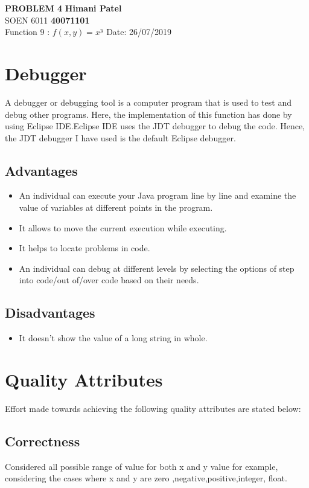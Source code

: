 \documentclass[a4paper, 11pt]{article}
\begin{document}
\noindent
\large\textbf{PROBLEM 4} \hfill \textbf{Himani Patel} \\
\normalsize SOEN 6011 \hfill \textbf{40071101} \\
Function 9 :  $f(x,y)= x^y$  \hfill Date: 26/07/2019 \\

\section{Debugger}

A debugger or debugging tool is a computer program that is used to test and debug other programs.
Here, the implementation of this function has done by using Eclipse IDE.Eclipse IDE uses the JDT debugger to debug the code. Hence, the JDT debugger I have used is the default Eclipse debugger.

\subsection{Advantages}
\begin{itemize}
  
  \item An individual can execute your Java program line by line and examine the value of variables at different points in the program.
  \item It allows to move the current execution while executing.
  \item It helps to locate problems in code.
  \item An individual can debug at different levels by selecting the options of step into code/out of/over code based on their needs.
  \end{itemize}


\subsection{Disadvantages}
\begin{itemize}
  \item It doesn't show the value of a long string in whole.
  \end{itemize}


\section{Quality Attributes}
Effort made towards achieving the following quality attributes are stated below: 

\subsection{Correctness}
Considered all possible range of value for both x and y value for example, considering the cases where x and y are zero ,negative,positive,integer, float. 
\end{document}
